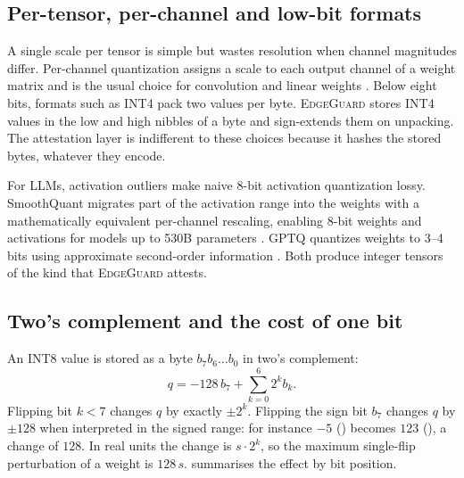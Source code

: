 \subsection{Per-tensor, per-channel and low-bit formats}

A single scale per tensor is simple but wastes resolution when channel magnitudes differ.
Per-channel quantization assigns a scale to each output channel of a weight matrix and is the
usual choice for convolution and linear weights \cite{nagel2021whitepaper}. Below eight bits,
formats such as INT4 pack two values per byte. \textsc{EdgeGuard} stores INT4 values in the
low and high nibbles of a byte and sign-extends them on unpacking. The attestation layer is
indifferent to these choices because it hashes the stored bytes, whatever they encode.

For LLMs, activation outliers make naive 8-bit activation quantization lossy. SmoothQuant
migrates part of the activation range into the weights with a mathematically equivalent
per-channel rescaling, enabling 8-bit weights and activations for models up to 530B parameters
\cite{xiao2023smoothquant}. GPTQ quantizes weights to 3--4 bits using approximate second-order
information \cite{frantar2023gptq}. Both produce integer tensors of the kind that
\textsc{EdgeGuard} attests.

\subsection{Two's complement and the cost of one bit}
\label{sec:bg:twos}

An INT8 value is stored as a byte $b_7b_6\dots b_0$ in two's complement:
\begin{equation}
  q = -128\,b_7 + \sum_{k=0}^{6} 2^k b_k .
\end{equation}
Flipping bit $k<7$ changes $q$ by exactly $\pm 2^k$. Flipping the sign bit $b_7$ changes $q$ by
$\pm128$ when interpreted in the signed range: for instance $-5$ () becomes $123$
(), a change of $128$. In real units the change is $s\cdot 2^k$, so the
maximum single-flip perturbation of a weight is $128\,s$. 
summarises the effect by bit position.

